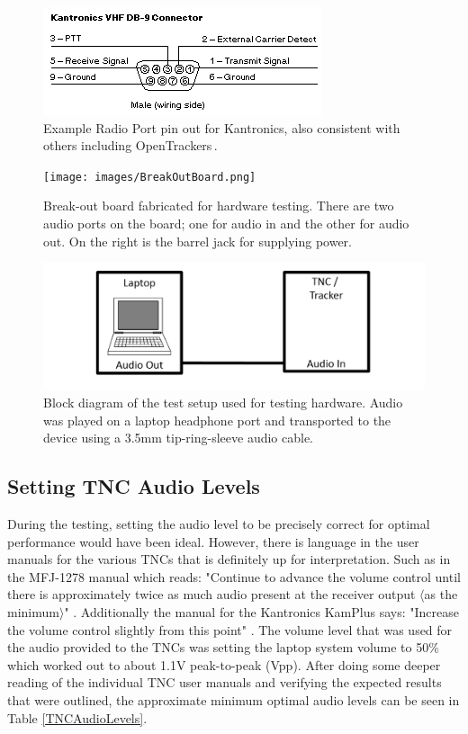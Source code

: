 \begin{figure}
  \centering
	\includegraphics[width=0.75\linewidth]{images/RadioPortPinout.png} 
	\caption{Example Radio Port pin out for Kantronics, also consistent with others including OpenTrackers\,\cite{Martin2014}.}
   \label{RadioPortPinout}
\end{figure}
\begin{figure}
  \centering
	\texttt{[image: images/BreakOutBoard.png]} 
	\caption[Break-out board fabricated for hardware testing.]{Break-out board fabricated for hardware testing. There are two audio ports on the board; one for audio in and the other for audio out. On the right is the barrel jack for supplying power.}
   \label{BreakOutBoard}
\end{figure}
\begin{figure}
  \centering
	\includegraphics[width=0.75\linewidth]{images/TNCLaptopTestSetup.PNG} 
	\caption[Block diagram of the test setup used for testing hardware.]{Block diagram of the test setup used for testing hardware. Audio was played on a laptop headphone port and transported to the device using a 3.5mm tip-ring-sleeve audio cable.}
   \label{TNCLaptopTestSetup}
\end{figure}

\subsection{Setting TNC Audio Levels}
During the testing, setting the audio level to be precisely correct for optimal performance would have been ideal. However, there is language in the user manuals for the various TNCs that is definitely up for interpretation. Such as in the MFJ-1278 manual which reads: "Continue to advance the volume control until there is approximately twice as much audio present at the receiver output $\langle$as the minimum$\rangle$" \cite{MFJ1278Man}. Additionally the manual for the Kantronics KamPlus says: "Increase the volume control slightly from this point" \cite{KamPlusGettingStarted}. The volume level that was used for the audio provided to the TNCs was setting the laptop system volume to 50\% which worked out to about 1.1V peak-to-peak (Vpp). After doing some deeper reading of the individual TNC user manuals and verifying the expected results that were outlined, the approximate minimum optimal audio levels can be seen in Table \ref{TNCAudioLevels}.

